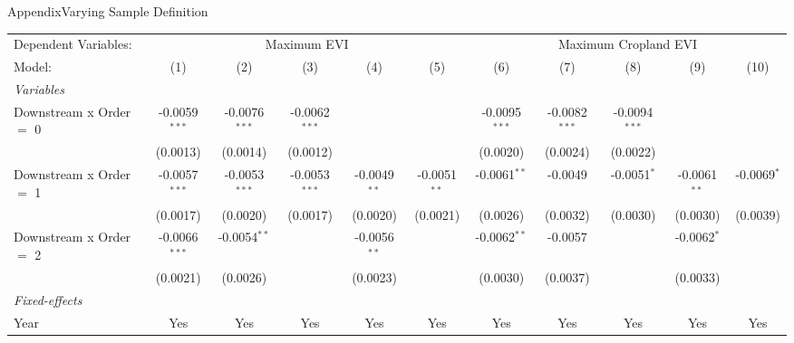 \documentclass[aspectratio=169,11pt,dvipsnames, handout]{beamer}
\begin{document}

\begin{frame}{\textcolor{defaultclr!30}{Appendix}\hspace{0.75em}Varying Sample Definition}
\label{frame:sampledef}

\begin{adjustbox}{width = \textwidth, center}
   \begin{tabular}{lcccccccccc}\label{tab:rob_subsets_order}
      \tabularnewline \midrule \midrule
      Dependent Variables: & \multicolumn{5}{c}{Maximum EVI} & \multicolumn{5}{c}{Maximum Cropland EVI}\\
      Model: & (1) & (2) & (3) & (4) & (5) & (6) & (7) & (8) & (9) & (10)\\
      \midrule
      \emph{Variables}\\
      Downstream x Order $=$ 0 & -0.0059$^{***}$ & -0.0076$^{***}$ & -0.0062$^{***}$ &                 &                & -0.0095$^{***}$ & -0.0082$^{***}$ & -0.0094$^{***}$ &                &   \\   
                               & (0.0013)        & (0.0014)        & (0.0012)        &                 &                & (0.0020)        & (0.0024)        & (0.0022)        &                &   \\   
      Downstream x Order $=$ 1 & -0.0057$^{***}$ & -0.0053$^{***}$ & -0.0053$^{***}$ & -0.0049$^{**}$  & -0.0051$^{**}$ & -0.0061$^{**}$  & -0.0049         & -0.0051$^{*}$   & -0.0061$^{**}$ & -0.0069$^{*}$\\   
                               & (0.0017)        & (0.0020)        & (0.0017)        & (0.0020)        & (0.0021)       & (0.0026)        & (0.0032)        & (0.0030)        & (0.0030)       & (0.0039)\\   
      Downstream x Order $=$ 2 & -0.0066$^{***}$ & -0.0054$^{**}$  &                 & -0.0056$^{**}$  &                & -0.0062$^{**}$  & -0.0057         &                 & -0.0062$^{*}$  &   \\   
                               & (0.0021)        & (0.0026)        &                 & (0.0023)        &                & (0.0030)        & (0.0037)        &                 & (0.0033)       &   \\   
      \midrule
      \emph{Fixed-effects}\\
      Year                     & Yes             & Yes             & Yes             & Yes             & Yes            & Yes             & Yes             & Yes             & Yes            & Yes\\  

\end{tabular}
\end{adjustbox}
\end{frame}
\end{document}
